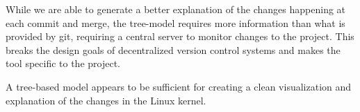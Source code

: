 \documentclass[conference, draftclsnofoot]{IEEEtran}
\begin{document}
While we are able to generate a better explanation of the changes happening at
each commit and merge, the tree-model requires more information than what is
provided by git, requiring a central server to monitor changes to the project.
This breaks the design goals of decentralized version control systems and makes
the tool specific to the project.

A tree-based model appears to be sufficient for creating a clean visualization
and explanation of the changes in the Linux kernel.



\end{document}
